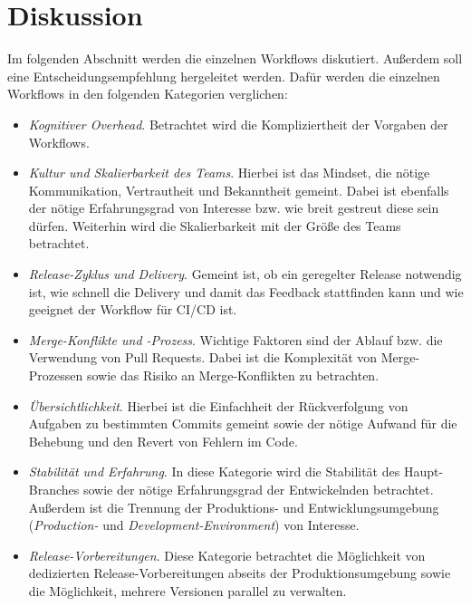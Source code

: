 
\section{Diskussion}
\label{sec:diskussion}

Im folgenden Abschnitt werden die einzelnen Workflows diskutiert. Außerdem soll eine Entscheidungsempfehlung hergeleitet werden. Dafür werden die einzelnen Workflows in den folgenden Kategorien verglichen:

\begin{itemize}
    \item \emph{Kognitiver Overhead}. Betrachtet wird die Kompliziertheit der Vorgaben der Workflows.
    
    \item \emph{Kultur und Skalierbarkeit des Teams}. Hierbei ist das Mindset, die nötige Kommunikation, Vertrautheit und Bekanntheit gemeint. Dabei ist ebenfalls der nötige Erfahrungsgrad von Interesse bzw. wie breit gestreut diese sein dürfen. Weiterhin wird die Skalierbarkeit mit der Größe des Teams betrachtet.
    
    \item \emph{Release\hyp Zyklus und Delivery}. Gemeint ist, ob ein geregelter Release notwendig ist, wie schnell die Delivery und damit das Feedback stattfinden kann und wie geeignet der Workflow für CI/CD ist.
    
    \item \emph{Merge\hyp Konflikte und -Prozess}. Wichtige Faktoren sind der Ablauf bzw. die Verwendung von Pull Requests. Dabei ist die Komplexität von Merge\hyp Prozessen sowie das Risiko an Merge\hyp Konflikten zu betrachten.
    
    \item \emph{Übersichtlichkeit}. Hierbei ist die Einfachheit der Rückverfolgung von Aufgaben zu bestimmten Commits gemeint sowie der nötige Aufwand für die Behebung und den Revert von Fehlern im Code.
    
    \item \emph{Stabilität und Erfahrung}. In diese Kategorie wird die Stabilität des Haupt\hyp Branches sowie der nötige Erfahrungsgrad der Entwickelnden betrachtet. Außerdem ist die Trennung der Produktions- und Entwicklungsumgebung (\emph{Production-} und \emph{Development\hyp Environment}) von Interesse.
    
    \item \emph{Release\hyp Vorbereitungen}. Diese Kategorie betrachtet die Möglichkeit von dedizierten Release\hyp Vorbereitungen abseits der Produktionsumgebung sowie die Möglichkeit, mehrere Versionen parallel zu verwalten.
\end{itemize}


